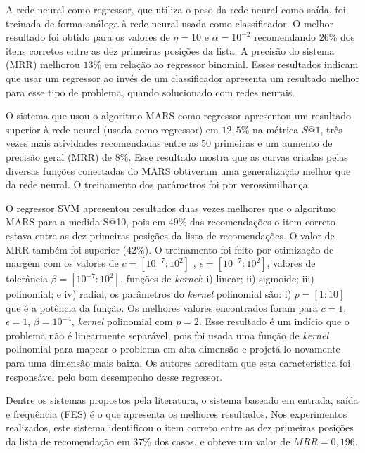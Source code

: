 \documentclass[10pt,letterpaper]{article}
\begin{document}
A rede neural como regressor, que utiliza o peso da rede neural como saída, foi treinada de forma análoga à rede neural usada como classificador. O melhor resultado foi obtido para os valores de \(\eta = 10\) e \(\alpha = 10^{-2}\) recomendando \(26\%\) dos itens corretos entre as dez primeiras posições da lista. A precisão do sistema (MRR) melhorou \(13\%\) em relação ao regressor binomial. Esses resultados indicam que usar um regressor ao invés de um classificador apresenta um resultado melhor para esse tipo de problema, quando solucionado com redes neurais.

O sistema que usou o algoritmo MARS como regressor apresentou um resultado superior à rede neural (usada como regressor) em \(12,5\%\) na métrica \(S@1\), três vezes mais atividades recomendadas entre as \(50\) primeiras e um aumento de precisão geral (MRR) de \(8\%\). Esse resultado mostra que as curvas criadas pelas diversas funções conectadas do MARS obtiveram uma generalização melhor que da rede neural. O treinamento dos parâmetros foi por verossimilhança.

O regressor SVM apresentou resultados duas vezes melhores que o algoritmo MARS para a medida S@10, pois em \(49\%\) das recomendações o item correto estava entre as dez primeiras posições da lista de recomendações. O valor de MRR também foi superior (\(42\%\)). O treinamento foi feito por otimização de margem com os valores de \(c = [10^{-7}:10^{2}]\) , \(\epsilon = [10^{-7}:10^{2}]\), valores de tolerância \(\beta = [10^{-7}:10^{2}]\), funções de \emph{kernel}: i) linear; ii) sigmoide; iii) polinomial; e iv) radial, os parâmetros do \emph{kernel} polinomial são: i) \(p = [1:10]\) que é a potência da função. Os melhores valores encontrados foram para \(c = 1\), \(\epsilon = 1\), \(\beta = 10^{-4}\), \emph{kernel} polinomial com \(p = 2\). Esse resultado é um indício que o problema não é linearmente separável, pois foi usada uma função de \emph{kernel} polinomial para mapear o problema em alta dimensão e projetá-lo novamente para uma dimensão mais baixa. Os autores acreditam que esta característica foi responsável pelo bom desempenho desse regressor.

Dentre os sistemas propostos pela literatura, o sistema baseado em entrada, saída e frequência (FES) \cite{Wang2008} é o que apresenta os melhores resultados. Nos experimentos realizados, este sistema identificou o item correto entre as dez primeiras posições da lista de recomendação em \(37\%\) dos casos, e obteve um valor de \(MRR = 0,196\).
\end{document}
